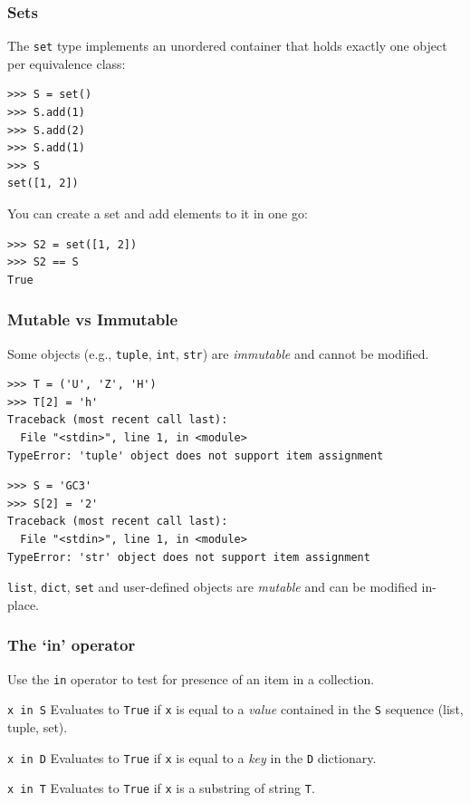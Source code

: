 \documentclass[english,serif,mathserif,xcolor=pdftex,dvipsnames,table]{beamer}
\begin{document}
\begin{frame}[fragile]
  \frametitle{Sets}
  The \texttt{set} type implements an unordered container that holds
  exactly one object per equivalence class:
\begin{lstlisting}
>>> S = set()
>>> S.add(1)
>>> S.add(2)
>>> S.add(1)
>>> S
set([1, 2])
\end{lstlisting}

  \+
  You can create a set and add elements to it in one go:
\begin{lstlisting}
>>> S2 = set([1, 2])
>>> S2 == S
True
\end{lstlisting}
\end{frame}


\begin{frame}[fragile]
  \frametitle{Mutable vs Immutable}
  Some objects (e.g., \texttt{tuple}, \texttt{int}, \texttt{str})
  are \emph{immutable} and cannot be modified.
\begin{lstlisting}[basicstyle=\footnotesize\ttfamily]
>>> T = ('U', 'Z', 'H')
>>> T[2] = 'h'
Traceback (most recent call last):
  File "<stdin>", line 1, in <module>
TypeError: 'tuple' object does not support item assignment
\end{lstlisting}

\+
\begin{lstlisting}
>>> S = 'GC3'
>>> S[2] = '2'
Traceback (most recent call last):
  File "<stdin>", line 1, in <module>
TypeError: 'str' object does not support item assignment
\end{lstlisting}


  \+
  \texttt{list}, \texttt{dict}, \texttt{set} and user-defined objects
  are \emph{mutable} and can be modified in-place.
\end{frame}



\begin{frame}[fragile]
  \frametitle{The `{\ttfamily\bfseries in}' operator}

  Use the \lstinline|in| operator to test for presence of an item in a
  collection.

  \begin{describe}{\lstinline|x in S|}
    Evaluates to \texttt{True} if \lstinline|x| is equal to a \emph{value}
    contained in the \lstinline|S| sequence (list, tuple, set).
  \end{describe}

  \begin{describe}{\lstinline|x in D|}
    Evaluates to \texttt{True} if \lstinline|x| is equal to a \emph{key}
    in the \lstinline|D| dictionary.
  \end{describe}

  \begin{describe}{\lstinline|x in T|}
    Evaluates to \texttt{True} if \lstinline|x| is a substring of
    string \lstinline|T|.
  \end{describe}

\end{frame}
\end{document}

